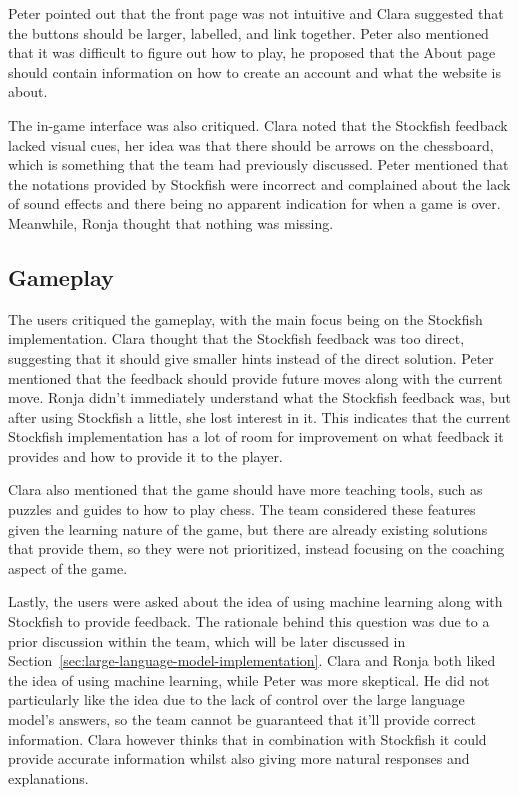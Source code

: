 Peter pointed out that the front page was not intuitive and Clara suggested that the buttons should be larger, labelled,
and link together.
Peter also mentioned that it was difficult to figure out how to play, he proposed that the About page should contain
information on how to create an account and what the website is about.

The in-game interface was also critiqued.
Clara noted that the Stockfish feedback lacked visual cues, her idea was that there should be arrows on the chessboard,
which is something that the team had previously discussed.
Peter mentioned that the notations provided by Stockfish were incorrect and complained about the lack of sound effects
and there being no apparent indication for when a game is over.
Meanwhile, Ronja thought that nothing was missing.

\subsection{Gameplay}\label{subsec:gameplay}

The users critiqued the gameplay, with the main focus being on the Stockfish implementation.
Clara thought that the Stockfish feedback was too direct, suggesting that it should give smaller hints instead of the
direct solution.
Peter mentioned that the feedback should provide future moves along with the current move.
Ronja didn't immediately understand what the Stockfish feedback was, but after using Stockfish a little, she lost
interest in it.
This indicates that the current Stockfish implementation has a lot of room for improvement on what feedback it provides
and how to provide it to the player.

Clara also mentioned that the game should have more teaching tools, such as puzzles and guides to how to play chess.
The team considered these features given the learning nature of the game, but there are already existing solutions that
provide them, so they were not prioritized, instead focusing on the coaching aspect of the game.

Lastly, the users were asked about the idea of using machine learning along with Stockfish to provide feedback.
The rationale behind this question was due to a prior discussion within the team, which will be later discussed in
Section~\ref{sec:large-language-model-implementation}.
Clara and Ronja both liked the idea of using machine learning, while Peter was more skeptical.
He did not particularly like the idea due to the lack of control over the large language model's answers, so the team
cannot be guaranteed that it'll provide correct information.
Clara however thinks that in combination with Stockfish it could provide accurate information whilst also giving more
natural responses and explanations.

